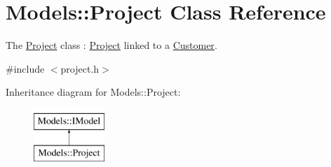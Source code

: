\hypertarget{classModels_1_1Project}{}\section{Models\+:\+:Project Class Reference}
\label{classModels_1_1Project}


The \hyperlink{classModels_1_1Project}{Project} class \+: \hyperlink{classModels_1_1Project}{Project} linked to a \hyperlink{classModels_1_1Customer}{Customer}.  




{\ttfamily \#include $<$project.\+h$>$}

Inheritance diagram for Models\+:\+:Project\+:\begin{figure}[H]
\begin{center}
\leavevmode
\includegraphics[height=2.000000cm]{dd/d3f/classModels_1_1Project}
\end{center}
\end{figure}
